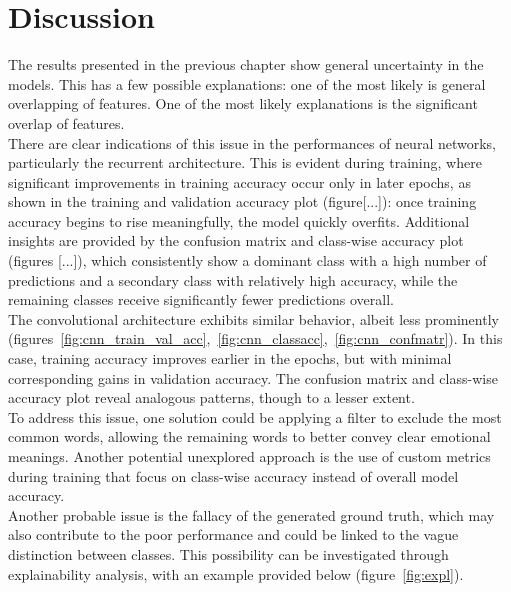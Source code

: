 \chapter*{Discussion}
\label{ch:discussion}
The results presented in the previous chapter show general
uncertainty in the models. This has a few possible explanations:
one of the most likely is general overlapping of features. One of the most likely
explanations is the significant overlap of features.\\

There are clear indications of this issue in the performances of neural networks,
particularly the recurrent architecture. This is evident during training, where
significant improvements in training accuracy occur only in later epochs, as shown
in the training and validation accuracy plot (figure[...]):
once training accuracy begins to rise meaningfully, the model quickly overfits.
Additional insights are provided by the confusion matrix and class-wise accuracy
plot (figures [...]), which consistently
show a dominant class with a high number of predictions and a secondary class
with relatively high accuracy, while the remaining classes receive significantly
fewer predictions overall.\\

The convolutional architecture exhibits similar behavior, albeit less prominently
(figures~\ref{fig:cnn_train_val_acc},~\ref{fig:cnn_classacc},~\ref{fig:cnn_confmatr}).
In this case, training accuracy improves earlier in the epochs,
but with minimal corresponding gains in validation accuracy.
The confusion matrix and class-wise accuracy plot reveal analogous patterns, though
to a lesser extent.\\

To address this issue, one solution could be applying a filter to exclude the most
common words, allowing the remaining words to better convey clear emotional
meanings. Another potential unexplored approach is the use of custom
metrics during training that focus on class-wise accuracy instead of overall model
accuracy.\\

Another probable issue is the fallacy of the generated ground truth, which may
also contribute to the poor performance and could be linked to the vague distinction
between classes.
This possibility can be investigated through explainability analysis, with an
example provided below (figure~\ref{fig:expl}).

